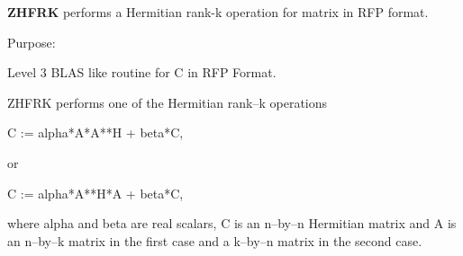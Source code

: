 {\bfseries Z\+H\+F\+R\+K} performs a Hermitian rank-\/k operation for matrix in R\+F\+P format. 

 \begin{DoxyParagraph}{Purpose\+: }
\begin{DoxyVerb} Level 3 BLAS like routine for C in RFP Format.

 ZHFRK performs one of the Hermitian rank--k operations

    C := alpha*A*A**H + beta*C,

 or

    C := alpha*A**H*A + beta*C,

 where alpha and beta are real scalars, C is an n--by--n Hermitian
 matrix and A is an n--by--k matrix in the first case and a k--by--n
 matrix in the second case.\end{DoxyVerb}
 
\end{DoxyParagraph}

